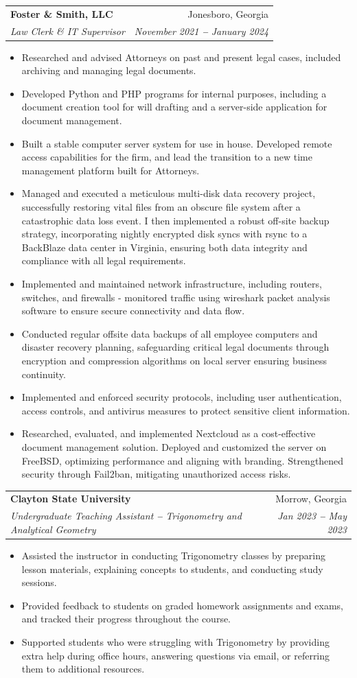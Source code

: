\documentclass[letterpaper,11pt]{article}
\makeatletter
\newcommand{\resumeItem}[1]{
  \item\small{
    {#1 \vspace{-2pt}}
  }
}
\newcommand{\resumeSubheading}[4]{
  \vspace{-2pt}\item
    \begin{tabular*}{\textwidth}[t]{l@{\extracolsep{\fill}}r}
      \textbf{#1} & #2 \\
      \textit{\small#3} & \textit{\small #4} \\
    \end{tabular*}\vspace{-7pt}
}
\newcommand{\resumeItemListStart}{\begin{itemize}[leftmargin=0.12in]}
\newcommand{\resumeItemListEnd}{\end{itemize}\vspace{-5pt}}
\makeatother
\begin{document}
    \resumeSubheading
      {Foster \& Smith, LLC}{Jonesboro, Georgia}
      {Law Clerk \& IT Supervisor}{November 2021 \textbf{--} January 2024}
        \resumeItemListStart
            \resumeItem{Researched and advised Attorneys on past and present legal cases, included archiving and managing legal documents.}
            \resumeItem{Developed Python and PHP programs for internal purposes, including a document creation tool for will drafting and a server-side application for document management.}
            \resumeItem{Built a stable computer server system for use in house. Developed remote access capabilities for the firm, and lead the transition to a new time management platform built for Attorneys.}
            \resumeItem{Managed and executed a meticulous multi-disk data recovery project, successfully restoring vital files from an obscure file system after a catastrophic data loss event. I then implemented a robust off-site backup strategy, incorporating nightly encrypted disk syncs with rsync to a BackBlaze data center in Virginia, ensuring both data integrity and compliance with all legal requirements.}
            \resumeItem{Implemented and maintained network infrastructure, including routers, switches, and firewalls - monitored traffic using wireshark packet analysis software to ensure secure connectivity and data flow.}
            \resumeItem{Conducted regular offsite data backups of all employee computers and disaster recovery planning, safeguarding critical legal documents through encryption and compression algorithms on local server ensuring business continuity.}
            \resumeItem{Implemented and enforced security protocols, including user authentication, access controls, and antivirus measures to protect sensitive client information.}
            \resumeItem{Researched, evaluated, and implemented Nextcloud as a cost-effective document management solution. Deployed and customized the server on FreeBSD, optimizing performance and aligning with branding. Strengthened security through Fail2ban, mitigating unauthorized access risks.}
        \resumeItemListEnd
    
    \resumeSubheading
      {Clayton State University}{Morrow, Georgia}
      {Undergraduate Teaching Assistant \textbf{--} Trigonometry and Analytical Geometry}{Jan 2023 \textbf{--} May 2023}
        \resumeItemListStart
            \resumeItem{Assisted the instructor in conducting Trigonometry classes by preparing lesson materials, explaining concepts to students, and conducting study sessions.}
            \resumeItem{Provided feedback to students on graded homework assignments and exams, and tracked their progress throughout the course.}
            \resumeItem{Supported students who were struggling with Trigonometry by providing extra help during office hours, answering questions via email, or referring them to additional resources.}
        \resumeItemListEnd
    
\end{document}
